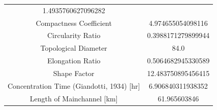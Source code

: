 \documentclass[11pt,]{article}
\begin{document}
\begin{longtable}[]{@{}cc@{}}
\begin{minipage}[t]{0.29\columnwidth}
1.4935760627096282\strut
\end{minipage}\tabularnewline
\begin{minipage}[t]{0.65\columnwidth}\centering\strut
Compactness Coefficient\strut
\end{minipage} & \begin{minipage}[t]{0.29\columnwidth}\centering\strut
4.974655054098116\strut
\end{minipage}\tabularnewline
\begin{minipage}[t]{0.65\columnwidth}\centering\strut
Circularity Ratio\strut
\end{minipage} & \begin{minipage}[t]{0.29\columnwidth}\centering\strut
0.3988171279899944\strut
\end{minipage}\tabularnewline
\begin{minipage}[t]{0.65\columnwidth}\centering\strut
Topological Diameter\strut
\end{minipage} & \begin{minipage}[t]{0.29\columnwidth}\centering\strut
84.0\strut
\end{minipage}\tabularnewline
\begin{minipage}[t]{0.65\columnwidth}\centering\strut
Elongation Ratio\strut
\end{minipage} & \begin{minipage}[t]{0.29\columnwidth}\centering\strut
0.5064682945330589\strut
\end{minipage}\tabularnewline
\begin{minipage}[t]{0.65\columnwidth}\centering\strut
Shape Factor\strut
\end{minipage} & \begin{minipage}[t]{0.29\columnwidth}\centering\strut
12.483750895456415\strut
\end{minipage}\tabularnewline
\begin{minipage}[t]{0.65\columnwidth}\centering\strut
Concentration Time (Giandotti, 1934) {[}hr{]}\strut
\end{minipage} & \begin{minipage}[t]{0.29\columnwidth}\centering\strut
6.906840311938352\strut
\end{minipage}\tabularnewline
\begin{minipage}[t]{0.65\columnwidth}\centering\strut
Length of Mainchannel {[}km{]}\strut
\end{minipage} & \begin{minipage}[t]{0.29\columnwidth}\centering\strut
61.965603846\strut
\end{minipage}\tabularnewline

\end{longtable}
\end{document}
